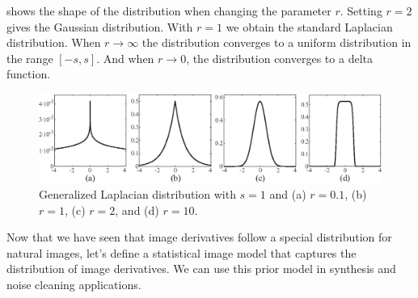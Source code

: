 \Fig{\ref{fig:generalizedgaussian}} shows the shape of the distribution when changing the parameter $r$. Setting $r=2$ gives the Gaussian distribution. With $r=1$ we obtain the standard Laplacian distribution.
When $r \to \infty$ the distribution converges to a uniform distribution in the range $\left[-s, s\right]$. And when $r \to 0$, the distribution converges to a delta function.
\begin{figure}[h]
\centerline{
\includegraphics[width=1\linewidth]{figures/statistical_image_models/shapes_generalized_laplacian.eps}
} 
\caption{Generalized Laplacian distribution with $s=1$ and (a) $r=0.1$, (b) $r=1$, (c) $r=2$, and (d) $r=10$. %
} 
\label{fig:generalizedgaussian}
\end{figure}












Now that we have seen that image derivatives follow a special distribution for natural images, let's define a statistical image model that captures the distribution of image derivatives. We can use this prior model in synthesis and noise cleaning applications.

